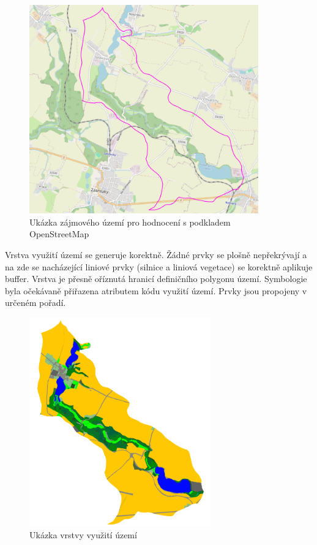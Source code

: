 \documentclass[a4paper,oneside,12pt]{book}
\begin{document}
\begin{figure}[H] \label{obr24}
\centering
\includegraphics[height=9cm]{pictures/casestudy1.png}
\caption{Ukázka zájmového území pro hodnocení s podkladem OpenStreetMap}
\label{cs1}
\end{figure}
\hspace{10mm} Vrstva využití území se generuje korektně. Žádné prvky se plošně nepřekrývají a na zde se nacházející liniové prvky (silnice a liniová vegetace) se korektně aplikuje buffer. Vrstva je přesně oříznutá hranicí definičního polygonu území. Symbologie byla očekávaně přiřazena atributem kódu využití území. Prvky jsou propojeny v určeném pořadí.


\begin{figure}[H] \label{obr25}
\centering
\includegraphics[height=9cm]{pictures/casestudy2.png}
\caption{Ukázka vrstvy využití území}
\label{cs2}
\end{figure}
\end{document}
